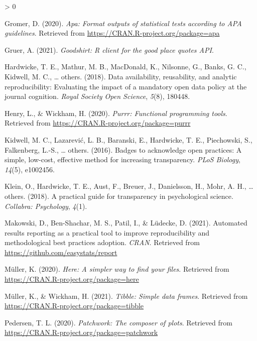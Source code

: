 \documentclass[
  english,
  man]{apa6}
\newlength{\cslhangindent}
\newenvironment{CSLReferences}[2] %
 {%
  \setlength{\parindent}{0pt}
  \ifodd #1 \everypar{\setlength{\hangindent}{\cslhangindent}}\ignorespaces\fi
  \ifnum #2 > 0
  \setlength{\parskip}{#2\baselineskip}
  \fi
 }%
 {}
\begin{document}
\begin{CSLReferences}{1}{0}
\leavevmode\hypertarget{ref-R-apa}{}%
Gromer, D. (2020). \emph{Apa: Format outputs of statistical tests according to APA guidelines}. Retrieved from \url{https://CRAN.R-project.org/package=apa}

\leavevmode\hypertarget{ref-R-goodshirt}{}%
Gruer, A. (2021). \emph{Goodshirt: R client for the good place quotes API}.

\leavevmode\hypertarget{ref-hardwicke2018data}{}%
Hardwicke, T. E., Mathur, M. B., MacDonald, K., Nilsonne, G., Banks, G. C., Kidwell, M. C., \ldots{} others. (2018). Data availability, reusability, and analytic reproducibility: Evaluating the impact of a mandatory open data policy at the journal cognition. \emph{Royal Society Open Science}, \emph{5}(8), 180448.

\leavevmode\hypertarget{ref-R-purrr}{}%
Henry, L., \& Wickham, H. (2020). \emph{Purrr: Functional programming tools}. Retrieved from \url{https://CRAN.R-project.org/package=purrr}

\leavevmode\hypertarget{ref-kidwell2016badges}{}%
Kidwell, M. C., Lazarević, L. B., Baranski, E., Hardwicke, T. E., Piechowski, S., Falkenberg, L.-S., \ldots{} others. (2016). Badges to acknowledge open practices: A simple, low-cost, effective method for increasing transparency. \emph{PLoS Biology}, \emph{14}(5), e1002456.

\leavevmode\hypertarget{ref-klein2018practical}{}%
Klein, O., Hardwicke, T. E., Aust, F., Breuer, J., Danielsson, H., Mohr, A. H., \ldots{} others. (2018). A practical guide for transparency in psychological science. \emph{Collabra: Psychology}, \emph{4}(1).

\leavevmode\hypertarget{ref-R-report}{}%
Makowski, D., Ben-Shachar, M. S., Patil, I., \& Lüdecke, D. (2021). Automated results reporting as a practical tool to improve reproducibility and methodological best practices adoption. \emph{CRAN}. Retrieved from \url{https://github.com/easystats/report}

\leavevmode\hypertarget{ref-R-here}{}%
Müller, K. (2020). \emph{Here: A simpler way to find your files}. Retrieved from \url{https://CRAN.R-project.org/package=here}

\leavevmode\hypertarget{ref-R-tibble}{}%
Müller, K., \& Wickham, H. (2021). \emph{Tibble: Simple data frames}. Retrieved from \url{https://CRAN.R-project.org/package=tibble}

\leavevmode\hypertarget{ref-R-patchwork}{}%
Pedersen, T. L. (2020). \emph{Patchwork: The composer of plots}. Retrieved from \url{https://CRAN.R-project.org/package=patchwork}


\end{CSLReferences}
\end{document}
